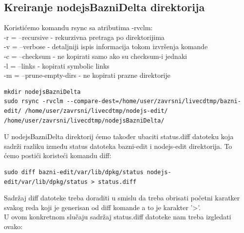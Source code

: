 \documentclass[12pt,vi]{mitthesis}
\begin{document}
\subsection*{Kreiranje nodejsBazniDelta direktorija}
\indent
Koristićemo komandu rsync sa atributima -rvclm:\\
-r = --recursive - rekurzivna pretraga po direktorijima\\
-v = --verbose - detaljniji ispis informacija tokom izvršenja komande\\
-c = --checksum - ne kopirati samo ako su checksum-i jednaki\\
-l = --links - kopirati symbolic links\\
-m = --prune-empty-dirs - ne kopirati prazne direktorije\\
\begin{lstlisting}[style=BashInputStyle]
mkdir nodejsBazniDelta
sudo rsync -rvclm --compare-dest=/home/user/zavrsni/livecdtmp/bazni-edit/ /home/user/zavrsni/livecdtmp/nodejs-edit/ /home/user/zavrsni/livecdtmp/nodejsBazniDelta/
\end{lstlisting}
\indent
U nodejsBazniDelta direktorij ćemo također ubaciti status.diff datoteku koja sadrži razliku između status datoteka bazni-edit i nodejs-edit direktorija. To ćemo postići koristeći komandu diff:
\begin{lstlisting}[style=BashInputStyle]
sudo diff bazni-edit/var/lib/dpkg/status nodejs-edit/var/lib/dpkg/status > status.diff
\end{lstlisting}
Sadržaj diff datoteke treba doraditi u smislu da treba obrisati početni karatker svakog reda koji je generisan od diff komande a to je karakter '>'.\\
U ovom konkretnom slučaju sadržaj status.diff datoteke nam treba izgledati ovako:
\end{document}
